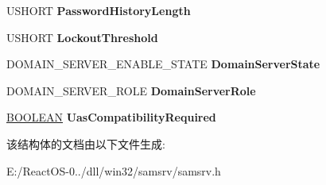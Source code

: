 \begin{DoxyCompactItemize}
U\+S\+H\+O\+RT {\bfseries Password\+History\+Length}
\item 
\mbox{\label{struct___s_a_m___d_o_m_a_i_n___f_i_x_e_d___d_a_t_a_ac6a97ea8716c46b6dd29922fe06e3f44}} 
U\+S\+H\+O\+RT {\bfseries Lockout\+Threshold}
\item 
\mbox{\label{struct___s_a_m___d_o_m_a_i_n___f_i_x_e_d___d_a_t_a_a21dad0e24e238e6008f7298ca69e0378}} 
D\+O\+M\+A\+I\+N\+\_\+\+S\+E\+R\+V\+E\+R\+\_\+\+E\+N\+A\+B\+L\+E\+\_\+\+S\+T\+A\+TE {\bfseries Domain\+Server\+State}
\item 
\mbox{\label{struct___s_a_m___d_o_m_a_i_n___f_i_x_e_d___d_a_t_a_a7d5ec89e3bc0e500d0ceef8834d96c16}} 
D\+O\+M\+A\+I\+N\+\_\+\+S\+E\+R\+V\+E\+R\+\_\+\+R\+O\+LE {\bfseries Domain\+Server\+Role}
\item 
\mbox{\label{struct___s_a_m___d_o_m_a_i_n___f_i_x_e_d___d_a_t_a_acd8217972ea9f5ac544a6968dd6eed1a}} 
\hyperlink{_processor_bind_8h_a112e3146cb38b6ee95e64d85842e380a}{B\+O\+O\+L\+E\+AN} {\bfseries Uas\+Compatibility\+Required}
\end{DoxyCompactItemize}


该结构体的文档由以下文件生成\+:\begin{DoxyCompactItemize}
\item 
E\+:/\+React\+O\+S-\/0../dll/win32/samsrv/samsrv.\+h\end{DoxyCompactItemize}

